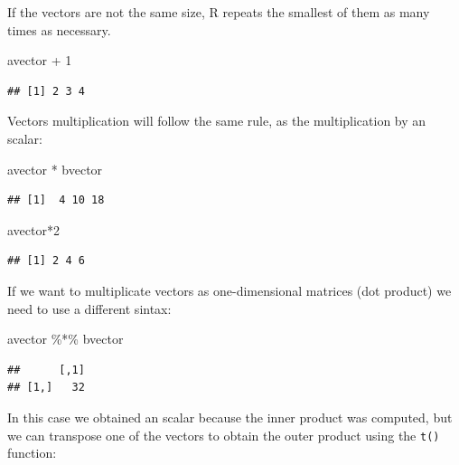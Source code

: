\documentclass[
]{book}
\newenvironment{Shaded}{\begin{snugshade}}{\end{snugshade}}
\newcommand{\DecValTok}[1]{\textcolor[rgb]{0.00,0.00,0.81}{#1}}
\newcommand{\NormalTok}[1]{#1}
\newcommand{\SpecialCharTok}[1]{\textcolor[rgb]{0.00,0.00,0.00}{#1}}
\begin{document}
If the vectors are not the same size, R repeats the smallest of them as many times as necessary.

\begin{Shaded}
\begin{Highlighting}[]
\NormalTok{avector }\SpecialCharTok{+} \DecValTok{1}
\end{Highlighting}
\end{Shaded}

\begin{verbatim}
## [1] 2 3 4
\end{verbatim}

Vectors multiplication will follow the same rule, as the multiplication by an scalar:

\begin{Shaded}
\begin{Highlighting}[]
\NormalTok{avector }\SpecialCharTok{*}\NormalTok{ bvector}
\end{Highlighting}
\end{Shaded}

\begin{verbatim}
## [1]  4 10 18
\end{verbatim}

\begin{Shaded}
\begin{Highlighting}[]
\NormalTok{avector}\SpecialCharTok{*}\DecValTok{2}
\end{Highlighting}
\end{Shaded}

\begin{verbatim}
## [1] 2 4 6
\end{verbatim}

If we want to multiplicate vectors as one-dimensional matrices (dot product) we need to use a different sintax:

\begin{Shaded}
\begin{Highlighting}[]
\NormalTok{avector }\SpecialCharTok{\%*\%}\NormalTok{ bvector}
\end{Highlighting}
\end{Shaded}

\begin{verbatim}
##      [,1]
## [1,]   32
\end{verbatim}

In this case we obtained an scalar because the inner product was computed, but we can transpose one of the vectors to obtain the outer product using the \texttt{t()} function:
\end{document}
